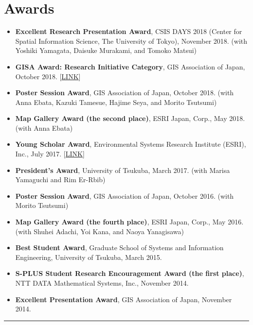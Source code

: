 \documentclass[]{book}
\providecommand{\tightlist}{%
  \setlength{\itemsep}{0pt}\setlength{\parskip}{0pt}}
\begin{document}
\hypertarget{awards}{%
\section*{Awards}\label{awards}}

\begin{itemize}
\tightlist
\item
  \textbf{Excellent Research Presentation Award}, CSIS DAYS 2018 (Center for Spatial Information Science, The University of Tokyo), November 2018.
  (with Yoshiki Yamagata, Daisuke Murakami, and Tomoko Matsui)
\item
  \textbf{GISA Award: Research Initiative Category}, GIS Association of Japan, October 2018. {[}\href{http://www.gisa-japan.org/file/nl108.pdf}{LINK}{]}
\item
  \textbf{Poster Session Award}, GIS Association of Japan, October 2018.
  (with Anna Ebata, Kazuki Tamesue, Hajime Seya, and Morito Tsutsumi)
\item
  \textbf{Map Gallery Award (the second place)}, ESRI Japan, Corp., May 2018.
  (with Anna Ebata)
\item
  \textbf{Young Scholar Award}, Environmental Systems Research Institute (ESRI), Inc., July 2017. {[}\href{https://www.esrij.com/cgi-bin/wp/wp-content/uploads/2017/01/YSA-Taiken2017.pdf}{LINK}{]}
\item
  \textbf{President's Award}, University of Tsukuba, March 2017.
  (with Marisa Yamaguchi and Rim Er-Rbib)
\item
  \textbf{Poster Session Award}, GIS Association of Japan, October 2016.
  (with Morito Tsutsumi)
\item
  \textbf{Map Gallery Award (the fourth place)}, ESRI Japan, Corp., May 2016.
  (with Shuhei Adachi, Yoi Kana, and Naoya Yanagisawa)
\item
  \textbf{Best Student Award}, Graduate School of Systems and Information Engineering, University of Tsukuba, March 2015.
\item
  \textbf{S-PLUS Student Research Encouragement Award (the first place)}, NTT DATA Mathematical Systems, Inc., November 2014.
\item
  \textbf{Excellent Presentation Award}, GIS Association of Japan, November 2014.
\end{itemize}

\begin{center}\rule{0.5\linewidth}{\linethickness}\end{center}
\end{document}
